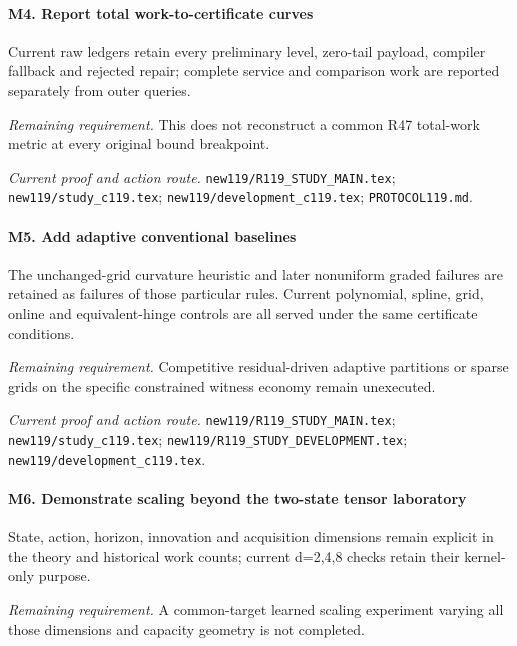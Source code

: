 \paragraph{M4. Report total work-to-certificate curves}

Current raw ledgers retain every preliminary level, zero-tail payload, compiler fallback and rejected repair; complete service and comparison work are reported separately from outer queries.

\par\emph{Remaining requirement.} This does not reconstruct a common R47 total-work metric at every original bound breakpoint.

\par\emph{Current proof and action route.} \nolinkurl{new119/R119_STUDY_MAIN.tex}; \nolinkurl{new119/study_c119.tex}; \nolinkurl{new119/development_c119.tex}; \nolinkurl{PROTOCOL119.md}.

\paragraph{M5. Add adaptive conventional baselines}

The unchanged-grid curvature heuristic and later nonuniform graded failures are retained as failures of those particular rules. Current polynomial, spline, grid, online and equivalent-hinge controls are all served under the same certificate conditions.

\par\emph{Remaining requirement.} Competitive residual-driven adaptive partitions or sparse grids on the specific constrained witness economy remain unexecuted.

\par\emph{Current proof and action route.} \nolinkurl{new119/R119_STUDY_MAIN.tex}; \nolinkurl{new119/study_c119.tex}; \nolinkurl{new119/R119_STUDY_DEVELOPMENT.tex}; \nolinkurl{new119/development_c119.tex}.

\paragraph{M6. Demonstrate scaling beyond the two-state tensor laboratory}

State, action, horizon, innovation and acquisition dimensions remain explicit in the theory and historical work counts; current d=2,4,8 checks retain their kernel-only purpose.

\par\emph{Remaining requirement.} A common-target learned scaling experiment varying all those dimensions and capacity geometry is not completed.

